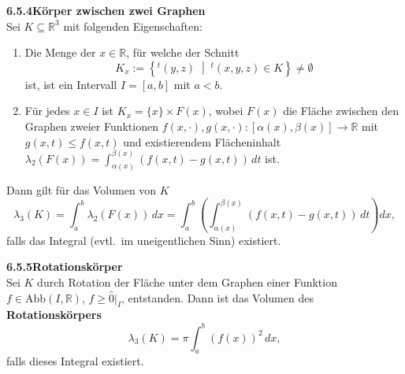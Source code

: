 \documentclass[a4paper,12pt]{article}
\newcommand{\gentry}[3]{%
  \noindent\textbf{#1\quad #2}\nopagebreak\\[0.2em]
  #3\par\smallskip
}
\begin{document}
\gentry{6.5.4}{Körper zwischen zwei Graphen}{%
  Sei $K \subseteq \mathbb{R}^3$ mit folgenden Eigenschaften:
  \begin{enumerate}[label=(\roman*),topsep=2pt,itemsep=1pt]
    \item Die Menge der $x \in \mathbb{R}$, für welche der \glqq{}Schnitt\grqq{}
          \[
            K_x := \left\{ {}^t(y,z) \;\middle|\; {}^t(x,y,z) \in K \right\} \neq \emptyset
          \]
          ist, ist ein Intervall $I = [a, b]$ mit $a < b$.
    \item Für jedes $x \in I$ ist $K_x = \{x\} \times F(x)$, wobei $F(x)$ die Fläche zwischen
          den Graphen zweier Funktionen
          $f(x, \cdot), g(x, \cdot) : [\alpha(x), \beta(x)] \longrightarrow \mathbb{R}$
          mit $g(x,t) \leq f(x,t)$ und existierendem Flächeninhalt
          $\lambda_2(F(x)) = \int_{\alpha(x)}^{\beta(x)} (f(x,t) - g(x,t))\, dt$ ist.
  \end{enumerate}
  Dann gilt für das Volumen von $K$
  \[
    \lambda_3(K) = \int_a^b \lambda_2(F(x))\, dx = \int_a^b \left( \int_{\alpha(x)}^{\beta(x)} (f(x,t) - g(x,t))\, dt \right) dx,
  \]
  falls das Integral (evtl.\ im uneigentlichen Sinn) existiert.
}

\gentry{6.5.5}{Rotationskörper}{%
  Sei $K$ durch Rotation der Fläche unter dem Graphen einer Funktion
  $f \in \mathrm{Abb}(I, \mathbb{R})$, $f \geq \widehat{0}|_I$, entstanden. Dann ist das
  Volumen des \textbf{Rotationskörpers}
  \[
    \lambda_3(K) = \pi \int_a^b (f(x))^2\, dx,
  \]
  falls dieses Integral existiert.
}
\end{document}
